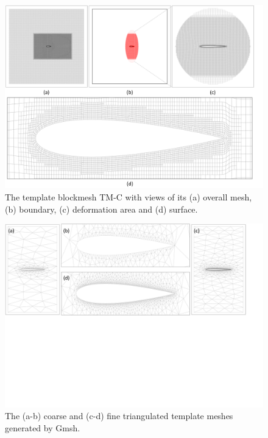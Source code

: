 \begin{figure}[!htb]
	\begin{center}
		\includegraphics[width=1\linewidth]{chapter3/tex/figures/experiment/init_template_mesh_blockmesh.pdf}
	\end{center}
	\caption{ \small
		The template blockmesh TM-C with views of its (a) overall mesh, (b) boundary, (c) deformation area and (d) surface.
	}
	\label{ch3:fig:discuss_init_blockmesh}
\end{figure}

\begin{figure}[!htb]
	\begin{center}
		\includegraphics[width=1\linewidth]{chapter3/tex/figures/experiment/init_template_mesh_gmsh.pdf}
	\end{center}
	\caption{
		\small The (a-b) coarse and (c-d) fine triangulated template meshes generated by Gmsh.
	}
	\label{ch3:fig:discuss_init_gmsh}
\end{figure}

